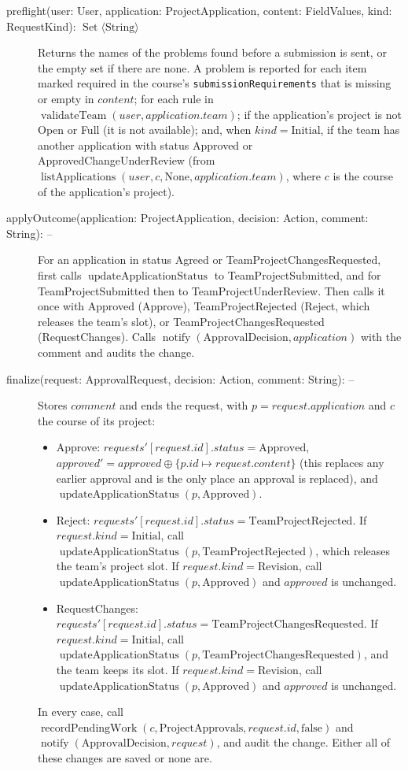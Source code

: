 \documentclass[12pt, titlepage]{article}
\begin{document}
\begin{description}
    \item[preflight(user: User, application: ProjectApplication, content: FieldValues, kind: RequestKind): $\operatorname{Set}\langle\text{String}\rangle$] Returns the names of the problems found before a submission is sent, or the empty set if there are none. A problem is reported for each item marked required in the course's \texttt{submissionRequirements} that is missing or empty in $content$; for each rule in $\operatorname{validateTeam}(user,application.team)$; if the application's project is not Open or Full (it is not available); and, when $kind=\text{Initial}$, if the team has another application with status Approved or ApprovedChangeUnderReview (from $\operatorname{listApplications}(user,c,\text{None},application.team)$, where $c$ is the course of the application's project).
    \item[applyOutcome(application: ProjectApplication, decision: Action, comment: String): --] For an application in status Agreed or TeamProjectChangesRequested, first calls $\operatorname{updateApplicationStatus}$ to TeamProjectSubmitted, and for TeamProjectSubmitted then to TeamProjectUnderReview. Then calls it once with Approved (Approve), TeamProjectRejected (Reject, which releases the team's slot), or TeamProjectChangesRequested (RequestChanges). Calls $\operatorname{notify}(\text{ApprovalDecision},application)$ with the comment and audits the change.
    \item[finalize(request: ApprovalRequest, decision: Action, comment: String): --] Stores $comment$ and ends the request, with $p=request.application$ and $c$ the course of its project:
    \begin{itemize}
        \item Approve: $\mathit{requests}'[request.id].status=\text{Approved}$, $\mathit{approved}'=\mathit{approved}\oplus\{p.id\mapsto request.content\}$ (this replaces any earlier approval and is the only place an approval is replaced), and $\operatorname{updateApplicationStatus}(p,\text{Approved})$.
        \item Reject: $\mathit{requests}'[request.id].status=\text{TeamProjectRejected}$. If $request.kind=\text{Initial}$, call $\operatorname{updateApplicationStatus}(p,\text{TeamProjectRejected})$, which releases the team's project slot. If $request.kind=\text{Revision}$, call $\operatorname{updateApplicationStatus}(p,\text{Approved})$ and $\mathit{approved}$ is unchanged.
        \item RequestChanges: $\mathit{requests}'[request.id].status=\text{TeamProjectChangesRequested}$. If $request.kind=\text{Initial}$, call $\operatorname{updateApplicationStatus}(p,\text{TeamProjectChangesRequested})$, and the team keeps its slot. If $request.kind=\text{Revision}$, call $\operatorname{updateApplicationStatus}(p,\text{Approved})$ and $\mathit{approved}$ is unchanged.
    \end{itemize}
    In every case, call $\operatorname{recordPendingWork}(c,\text{ProjectApprovals},request.id,\text{false})$ and $\operatorname{notify}(\text{ApprovalDecision},request)$, and audit the change. Either all of these changes are saved or none are.
\end{description}
\end{document}
